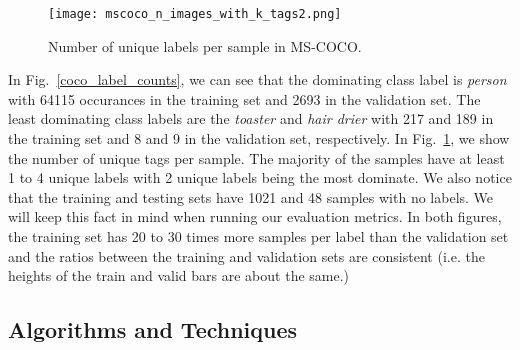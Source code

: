 \documentclass[12pt,journal,compsoc]{IEEEtran}
\begin{document}
\begin{figure}[!t]
\normalsize
\texttt{[image: mscoco\_n\_images\_with\_k\_tags2.png]}
\caption{Number of unique labels per sample in MS-COCO.}
\label{coco_n_images_with_k_tags}
\vspace*{4pt}
\end{figure}

In Fig.~\ref{coco_label_counts}, we can see that the dominating class label is \textit{person} with 64115 occurances in the training set and 2693 in the validation set. The least dominating class labels are the \textit{toaster} and \textit{hair drier} with 217 and 189 in the training set and 8 and 9 in the validation set, respectively.
In Fig.~\ref{coco_n_images_with_k_tags}, we show the number of unique tags per sample.  The majority of the samples have at least 1 to 4 unique labels with 2 unique labels being the most dominate.  We also notice that the training and testing sets have 1021 and 48 samples with no labels. We will keep this fact in mind when running our evaluation metrics.
In both figures, the training set has 20 to 30 times more samples per label than the validation set and the ratios between the training and validation sets are consistent (i.e. the heights of the train and valid bars are about the same.)

\subsection{Algorithms and Techniques}\label{sec:algo}

\end{document}

